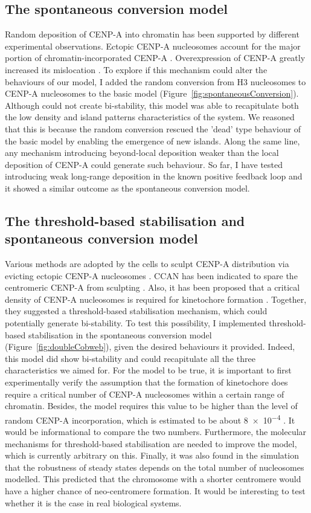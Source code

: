 \subsection{The spontaneous conversion model}

Random deposition of CENP-A into chromatin has been supported by different experimental observations. Ectopic CENP-A nucleosomes account for the major portion of chromatin-incorporated CENP-A \citep{Bodor2014}. Overexpression of CENP-A greatly increased its mislocation \citep{Gascoigne2011, VanHooser2001SpecificationCENP-A}. To explore if this mechanism could alter the behaviours of our model, I added the random conversion from H3 nucleosomes to CENP-A nucleosomes to the basic model (Figure~\ref{fig:spontaneousConversion}). Although could not create bi-stability, this model was able to recapitulate both the low density and island patterns characteristics of the system. We reasoned that this is because the random conversion rescued the 'dead' type behaviour of the basic model by enabling the emergence of new islands. Along the same line, any mechanism introducing beyond-local deposition weaker than the local deposition of CENP-A could generate such behaviour. So far, I have tested introducing weak long-range deposition in the known positive feedback loop and it showed a similar outcome as the spontaneous conversion model. 

\subsection{The threshold-based stabilisation and spontaneous conversion model}

Various methods are adopted by the cells to sculpt CENP-A distribution via evicting ectopic CENP-A nucleosomes \citep{Stirpe2022}. CCAN has been indicated to spare the centromeric CENP-A from sculpting \citep{Nechemia-Arbely2019}. Also, it has been proposed that a critical density of CENP-A nucleosomes is required for kinetochore formation \citep{Bodor2014}. Together, they suggested a threshold-based stabilisation mechanism, which could potentially generate bi-stability. To test this possibility, I implemented threshold-based stabilisation in the spontaneous conversion model (Figure~\ref{fig:doubleCobweb}), given the desired behaviours it provided. Indeed, this model did show bi-stability and could recapitulate all the three characteristics we aimed for. For the model to be true, it is important to first experimentally verify the assumption that the formation of kinetochore does require a critical number of CENP-A nucleosomes within a certain range of chromatin. Besides, the model requires this value to be higher than the level of random CENP-A incorporation, which is estimated to be about \num{8e-4} \citep{Bodor2014}. It would be informational to compare the two numbers. Furthermore, the molecular mechanisms for threshold-based stabilisation are needed to improve the model, which is currently arbitrary on this. Finally, it was also found in the simulation that the robustness of steady states depends on the total number of nucleosomes modelled. This predicted that the chromosome with a shorter centromere would have a higher chance of neo-centromere formation. It would be interesting to test whether it is the case in real biological systems. 
